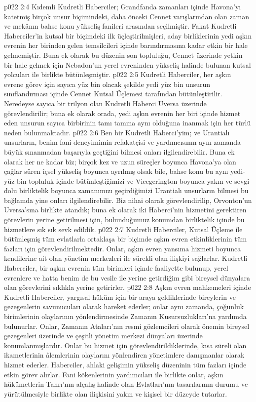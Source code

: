 \vs p022 2:4 Kıdemli Kudretli Haberciler; Grandfanda zamanları içinde Havona’yı katetmiş birçok unsur biçimindeki, daha önceki Cennet varışlarından olan zaman ve mekânın bahse konu yükseliş fanileri arasından seçilmiştir. Fakat Kudretli Haberciler’in kutsal bir biçimdeki ilk üçleştirilmişleri, aday birliklerinin yedi aşkın evrenin her birinden gelen temsilcileri içinde barındırmasına kadar etkin bir hale gelmemiştir. Buna ek olarak bu düzenin son topluluğu, Cennet üzerinde yetkin bir hale gelmek için Nebadon’un yerel evreninden yükseliş halinde bulunan kutsal yolcuları ile birlikte bütünleşmiştir.
\vs p022 2:5 Kudretli Haberciler, her aşkın evrene görev için sayıca yüz bin olacak şekilde yedi yüz bin unsurun sınıflandırması içinde Cennet Kutsal Üçlemesi tarafından bütünleştirilir. Neredeyse sayıca bir trilyon olan Kudretli Haberci Uversa üzerinde görevlendirilir; buna ek olarak orada, yedi aşkın evrenin her biri içinde hizmet eden unsurun sayıca birbirinin tamı tamına aynı olduğuna inanmak için her türlü neden bulunmaktadır.
\vs p022 2:6 Ben bir Kudretli Haberci’yim; ve Urantialı unsurların, benim fani deneyimimin refakatçisi ve yardımcısının aynı zamanda büyük sınanmadan başarıyla geçtiğini bilmesi onları ilgilendirebilir. Buna ek olarak her ne kadar biz; birçok kez ve uzun süreçler boyunca Havona’ya olan çağlar süren içsel yükseliş boyunca ayrılmış olsak bile, bahse konu bu aynı yedi\hyp{}yüz\hyp{}bin topluluk içinde bütünleştiğimizi ve Vicegerington boyunca yakın ve sevgi dolu birliktelik boyunca zamanımızı geçirdiğimizi Urantialı unsurların bilmesi bu bağlamda yine onları ilgilendirebilir. Biz nihai olarak görevlendirilip, Orvonton’un Uversa’sına birlikte atandık; buna ek olarak iki Haberci’nin hizmetini gerektiren görevlerin yerine getirilmesi için, bulunduğumuz konumdan birliktelik içinde bu hizmetlere sık sık sevk edildik.
\vs p022 2:7 Kudretli Haberciler, Kutsal Üçleme ile bütünleşmiş tüm evlatlarla ortaklaşa bir biçimde aşkın evren etkinliklerinin tüm fazları için görevlendirilmektedir. Onlar, aşkın evren yansıma hizmeti boyunca kendilerine ait olan yönetim merkezleri ile sürekli olan ilişkiyi sağlarlar. Kudretli Haberciler, bir aşkın evrenin tüm birimleri içinde faaliyette bulunup, yerel evrenlere ve hatta benim de bu vesile ile yerine getirdiğim gibi bireysel dünyalara olan görevlerini sıklıkla yerine getirirler.
\vs p022 2:8 Aşkın evren mahkemeleri içinde Kudretli Haberciler, yargısal hüküm için bir araya geldiklerinde bireylerin ve gezegenlerin savunucuları olarak hareket ederler; onlar aynı zamanda, çoğunluk birimlerinin olaylarının yönlendirmesinde Zamanın Kusursuzlukları’na yardımda bulunurlar. Onlar, Zamanın Ataları’nın resmi gözlemcileri olarak önemin bireysel gezegenleri üzerinde ve çeşitli yönetim merkezi dünyaları üzerinde konumlanmışlardır. Onlar bu hizmet için görevlendirildiklerinde, kısa süreli olan ikametlerinin âlemlerinin olaylarını yönlendiren yönetimlere danışmanlar olarak hizmet ederler. Haberciler, ahlaki gelişimin yükseliş düzeninin tüm fazları içinde etkin görev alırlar. Fani kökenlerinin yardımcıları ile birlikte onlar, aşkın hükümetlerin Tanrı’nın alçalış halinde olan Evlatları’nın tasarılarının durumu ve yürütülmesiyle birlikte olan ilişkisini yakın ve kişisel bir düzeyde tutarlar.
